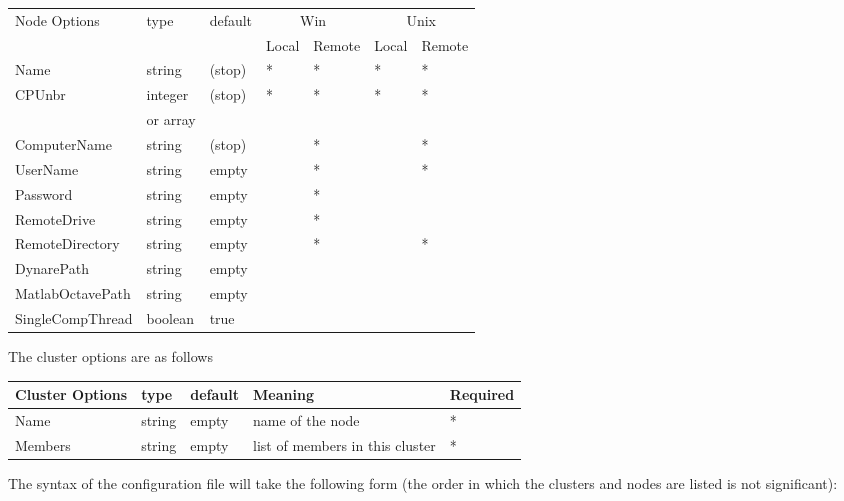 \documentclass[12pt,a4paper,pdftex]{article}
\begin{document}
\singlespacing  \noindent
{\footnotesize
      \begin{tabular}{|l|l|l|l|l|l|l|}
        \hline
 Node Options & type & default & \multicolumn{2}{c|}{Win} & \multicolumn{2}{c|}{Unix} \\
 & &  & Local & Remote & Local & Remote \\ \hline
 Name & string & (stop) & *&*&*&*\\
 CPUnbr & integer & (stop) &*&*&*&*\\
  & or array & & & & & \\
 ComputerName & string & (stop) & &*& &*\\
 UserName & string & empty & &*& &*\\
 Password & string & empty & &*& & \\
 RemoteDrive & string & empty & &*& & \\
 RemoteDirectory & string & empty & &*& &*\\
 DynarePath & string & empty & & & & \\
 MatlabOctavePath & string & empty & & & & \\
 SingleCompThread & boolean & true & & & & \\
        \hline
      \end{tabular}
}
\doublespacing

\vspace{1cm}
The cluster options are as follows

\singlespacing \noindent
{\footnotesize
      \begin{tabular}{|l|l|l|l|l|}
        \hline
 Cluster Options & type & default & Meaning & Required \\ \hline
 Name & string & empty & name of the node &*\\
 Members & string & empty & list of members in this cluster &*\\
        \hline
      \end{tabular}
}
\doublespacing

\vspace{1cm}
The syntax of the configuration file will take the following form (the order in which the clusters and nodes are listed is not significant):
\end{document}
